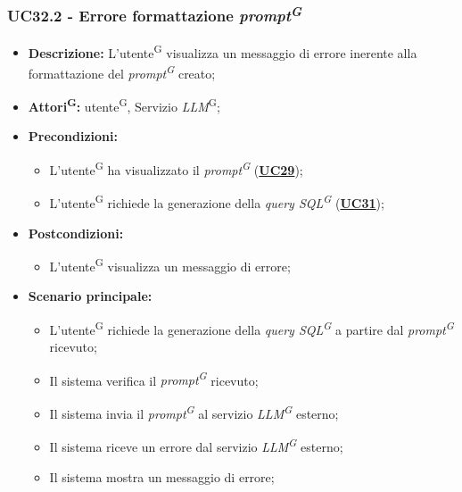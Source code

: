 \subsubsection{UC32.2 - Errore formattazione \textit{prompt\textsuperscript{G}}}
\label{sec:UC32.2}
\begin{itemize}
	\item \textbf{Descrizione:} L'utente\textsuperscript{G} visualizza un messaggio di errore inerente alla formattazione del \textit{prompt\textsuperscript{G}} creato;
	\item \textbf{Attori\textsuperscript{G}:} utente\textsuperscript{G}, Servizio \textit{LLM}\textsuperscript{G};
	\item \textbf{Precondizioni:} 
	\begin{itemize}
		\item L'utente\textsuperscript{G} ha visualizzato il \textit{prompt\textsuperscript{G}} (\hyperref[sec:UC29]{\textbf{UC29}});
		\item L'utente\textsuperscript{G} richiede la generazione della \textit{query SQL\textsuperscript{G}} (\hyperref[sec:UC31]{\textbf{UC31}});
	\end{itemize}
	\item \textbf{Postcondizioni:} 
	\begin{itemize}
		\item L'utente\textsuperscript{G} visualizza un messaggio di errore;
	\end{itemize}
	\item \textbf{Scenario principale:}
	\begin{itemize}
		\item L'utente\textsuperscript{G} richiede la generazione della \textit{query SQL\textsuperscript{G}} a partire dal \textit{prompt\textsuperscript{G}} ricevuto;
		\item Il sistema verifica il \textit{prompt\textsuperscript{G}} ricevuto;
		\item Il sistema invia il \textit{prompt\textsuperscript{G}} al servizio \textit{LLM\textsuperscript{G}} esterno;
		\item Il sistema riceve un errore dal servizio \textit{LLM\textsuperscript{G}} esterno;
		\item Il sistema mostra un messaggio di errore;
	\end{itemize}
\end{itemize}

